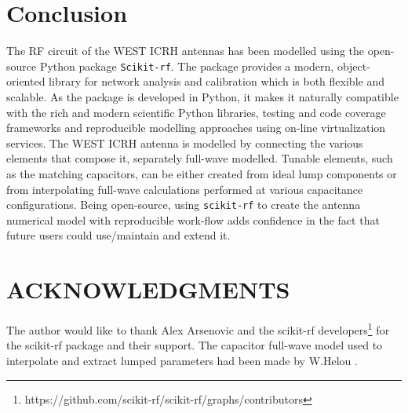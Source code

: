 \documentclass[%
aip,
cp,  %
amsmath,amssymb,%
reprint,%
]{revtex4-2}
\begin{document}
	\section{Conclusion}
	The RF circuit of the WEST ICRH antennas has been modelled using the open-source Python package \texttt{Scikit-rf}. The package provides a modern, object-oriented library for network analysis and calibration which is both flexible and scalable. As the package is developed in Python, it makes it naturally compatible with the rich and modern scientific Python libraries, testing and code coverage frameworks and reproducible modelling approaches using on-line virtualization services. The WEST ICRH antenna is modelled by connecting the various elements that compose it, separately full-wave modelled. Tunable elements, such as the matching capacitors, can be either created from ideal lump components or from interpolating full-wave calculations performed at various capacitance configurations. Being open-source, using \texttt{scikit-rf} to create the antenna numerical model with reproducible work-flow adds confidence in the fact that future users could use/maintain and extend it.
	
	
	\section{ACKNOWLEDGMENTS}
	The author would like to thank Alex Arsenovic and the  scikit-rf developers\footnote{https://github.com/scikit-rf/scikit-rf/graphs/contributors} for the scikit-rf package and their support. The capacitor full-wave model used to interpolate and extract lumped parameters had been made by W.Helou \cite{Helou2018_PhD}.
	
	
	
\end{document}
